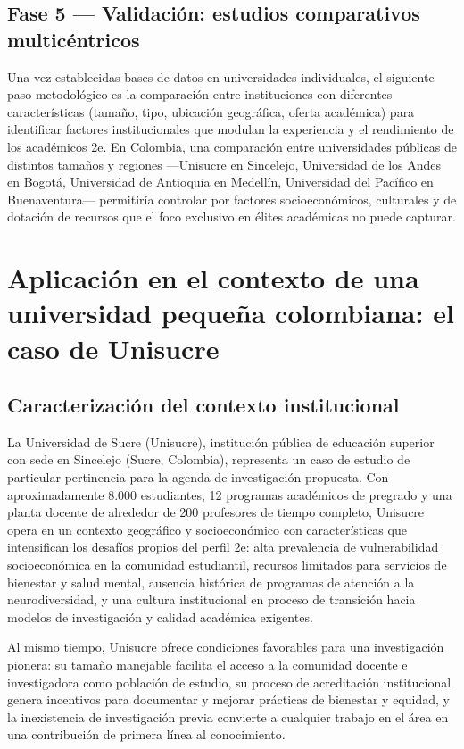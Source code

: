 \subsection{Fase 5 — Validación: estudios comparativos multicéntricos}

Una vez establecidas bases de datos en universidades individuales, el siguiente
paso metodológico es la comparación entre instituciones con diferentes
características (tamaño, tipo, ubicación geográfica, oferta académica) para
identificar factores institucionales que modulan la experiencia y el rendimiento
de los académicos 2e. En Colombia, una comparación entre universidades públicas
de distintos tamaños y regiones —Unisucre en Sincelejo, Universidad de los Andes
en Bogotá, Universidad de Antioquia en Medellín, Universidad del Pacífico en
Buenaventura— permitiría controlar por factores socioeconómicos, culturales y
de dotación de recursos que el foco exclusivo en élites académicas no puede capturar.

\section{Aplicación en el contexto de una universidad pequeña colombiana:
         el caso de Unisucre}
\label{sec:unisucre}

\subsection{Caracterización del contexto institucional}

La Universidad de Sucre (Unisucre), institución pública de educación superior con
sede en Sincelejo (Sucre, Colombia), representa un caso de estudio de particular
pertinencia para la agenda de investigación propuesta. Con aproximadamente 8.000
estudiantes, 12 programas académicos de pregrado y una planta docente de alrededor
de 200 profesores de tiempo completo, Unisucre opera en un contexto geográfico
y socioeconómico con características que intensifican los desafíos propios del
perfil 2e: alta prevalencia de vulnerabilidad socioeconómica en la comunidad
estudiantil, recursos limitados para servicios de bienestar y salud mental,
ausencia histórica de programas de atención a la neurodiversidad, y una cultura
institucional en proceso de transición hacia modelos de investigación y calidad
académica exigentes.

Al mismo tiempo, Unisucre ofrece condiciones favorables para una investigación
pionera: su tamaño manejable facilita el acceso a la comunidad docente e
investigadora como población de estudio, su proceso de acreditación institucional
genera incentivos para documentar y mejorar prácticas de bienestar y equidad, y
la inexistencia de investigación previa convierte a cualquier trabajo en el área
en una contribución de primera línea al conocimiento.

